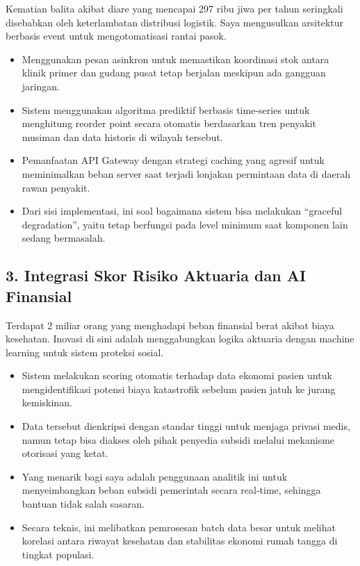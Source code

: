 \documentclass[
  letterpaper,
  DIV=11,
  numbers=noendperiod]{scrreprt}
\begin{document}
Kematian balita akibat diare yang mencapai 297 ribu jiwa per tahun
seringkali disebabkan oleh keterlambatan distribusi logistik. Saya
mengusulkan arsitektur berbasis event untuk mengotomatisasi rantai
pasok.

\begin{itemize}
\item
  Menggunakan pesan asinkron untuk memastikan koordinasi stok antara
  klinik primer dan gudang pusat tetap berjalan meskipun ada gangguan
  jaringan.
\item
  Sistem menggunakan algoritma prediktif berbasis time-series untuk
  menghitung reorder point secara otomatis berdasarkan tren penyakit
  musiman dan data historis di wilayah tersebut.
\item
  Pemanfaatan API Gateway dengan strategi caching yang agresif untuk
  meminimalkan beban server saat terjadi lonjakan permintaan data di
  daerah rawan penyakit.
\item
  Dari sisi implementasi, ini soal bagaimana sistem bisa melakukan
  ``graceful degradation'', yaitu tetap berfungsi pada level minimum
  saat komponen lain sedang bermasalah.
\end{itemize}

\subsection{3. Integrasi Skor Risiko Aktuaria dan AI
Finansial}\label{integrasi-skor-risiko-aktuaria-dan-ai-finansial}

Terdapat 2 miliar orang yang menghadapi beban finansial berat akibat
biaya kesehatan. Inovasi di sini adalah menggabungkan logika aktuaria
dengan machine learning untuk sistem proteksi sosial.

\begin{itemize}
\item
  Sistem melakukan scoring otomatis terhadap data ekonomi pasien untuk
  mengidentifikasi potensi biaya katastrofik sebelum pasien jatuh ke
  jurang kemiskinan.
\item
  Data tersebut dienkripsi dengan standar tinggi untuk menjaga privasi
  medis, namun tetap bisa diakses oleh pihak penyedia subsidi melalui
  mekanisme otorisasi yang ketat.
\item
  Yang menarik bagi saya adalah penggunaan analitik ini untuk
  menyeimbangkan beban subsidi pemerintah secara real-time, sehingga
  bantuan tidak salah sasaran.
\item
  Secara teknis, ini melibatkan pemrosesan batch data besar untuk
  melihat korelasi antara riwayat kesehatan dan stabilitas ekonomi rumah
  tangga di tingkat populasi.
\end{itemize}
\end{document}
